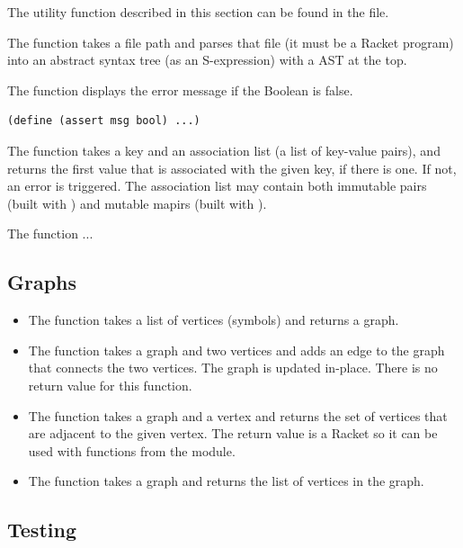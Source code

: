 \documentclass[11pt]{book}
\begin{document}
The utility function described in this section can be found in the
 file.

The  function takes a file path and parses that file
(it must be a Racket program) into an abstract syntax tree (as an
S-expression) with a  AST at the top.

The  function displays the error message  if the
Boolean  is false.
\begin{lstlisting}
(define (assert msg bool) ...)
\end{lstlisting}

The  function takes a key and an association list (a list
of key-value pairs), and returns the first value that is associated
with the given key, if there is one. If not, an error is triggered.
The association list may contain both immutable pairs (built with
) and mutable mapirs (built with ).

The  function ...


\subsection{Graphs}

\begin{itemize}
\item The  function takes a list of vertices
  (symbols) and returns a graph.

\item The  function takes a graph and two vertices and
  adds an edge to the graph that connects the two vertices. The graph
  is updated in-place. There is no return value for this function.

\item The  function takes a graph and a vertex and
  returns the set of vertices that are adjacent to the given
  vertex. The return value is a Racket  so it can be
  used with functions from the  module.

\item The  function takes a graph and returns the list
  of vertices in the graph.
\end{itemize}

\subsection{Testing}
\end{document}
